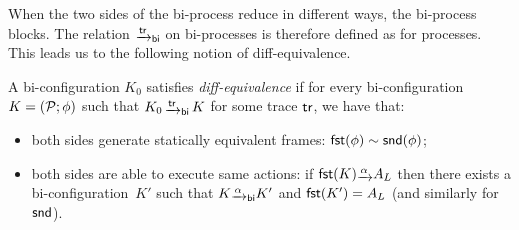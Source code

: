 When the two sides of the bi-process reduce in different ways,
the bi-process blocks. The relation $\sint{\tr}_{\mathsf{bi}}$
on bi-processes is therefore defined as for processes.
This leads us to the following notion of diff-equivalence.

\begin{definition}
\label{def:diff-equiv}
A bi-configuration $K_0$ satisfies \emph{diff-equivalence} if for
every bi-configuration
$K = (\mathcal{P};\phi)$ such that $K_0 \,\sint{\tr}_{\mathsf{bi}}\, K$
for some trace $\mathsf{tr}$, we have that:
\begin{itemize}
\item both sides generate statically equivalent frames:
  $\mathsf{fst}(\phi) \sim \mathsf{snd}(\phi)$;  
\item both sides are able to execute same actions:
  if $\fst(K) \lrstep{\alpha} A_L$ then there exists a
  bi-configuration~$K'$ such that $K \lrstep{\alpha}_{\mathsf{bi}} K'$ and
  $\mathsf{fst}(K') =A_L$ (and similarly for $\mathsf{snd}$).
\end{itemize} 
\end{definition}



